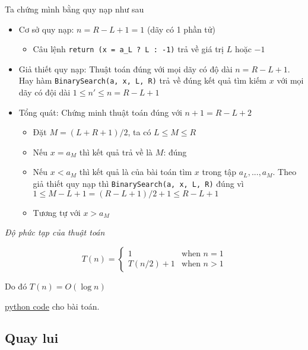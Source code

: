 Ta chứng mình bằng quy nạp như sau 
\begin{itemize}
    \item Cơ sở quy nạp: $n = R - L + 1 = 1$ (dãy có 1 phần tử)
    \begin{itemize}
        \item Câu lệnh \lstinline{return (x = a_L ? L : -1)} trả về giá trị $L$ hoặc $-1$
    \end{itemize}
    
    \item Giả thiết quy nạp: Thuật toán đúng với mọi dãy có độ dài $n = R-L+1$.
    Hay hàm \lstinline{BinarySearch(a, x, L, R)} trả về đúng kết quả tìm kiếm $x$ với mọi dãy
    có đội dài $1 \leq n' \leq n = R - L + 1$

    \item Tổng quát: Chứng minh thuật toán đúng với $n+1 = R-L+2$
    \begin{itemize}
        \item Đặt $M=(L+R+1)/2$, ta có $L \leq M \leq R$
        \item Nếu $x = a_M$ thì kết quả trả về là $M$: đúng
        \item Nếu $x < a_M$ thì kết quả là của bài toán tìm $x$ trong tập $a_L, ... , a_M$.
        Theo giả thiết quy nạp thì \lstinline{BinarySearch(a, x, L, R)} đúng vì 
        $1 \leq M - L + 1 = (R - L + 1)/2 + 1 \leq R - L + 1$
        \item Tương tự với $x > a_M$
    \end{itemize}
\end{itemize}

\textit{Độ phức tạp của thuật toán}

\begin{equation*}
    T(n) = 
    \begin{cases}
        1 & \text{when } n = 1 \\
        T(n/2) + 1 & \text{when } n > 1
    \end{cases}
\end{equation*}

Do đó $T(n) = O(\log n)$

\href{https://github.com/batman0911/dma_homework/blob/master/hw_01/src/main.ipynb}{python code} 
cho bài toán.



\subsection{Quay lui}

